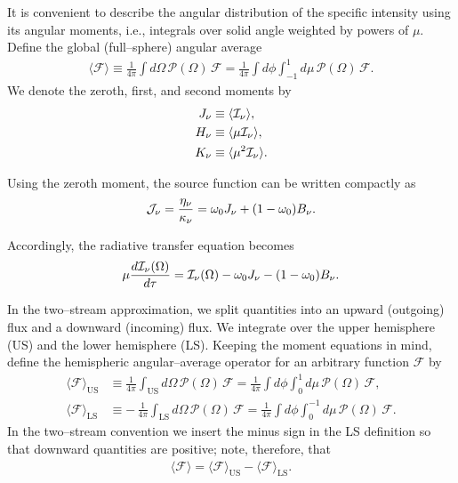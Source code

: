 It is convenient to describe the angular distribution of the specific intensity using its angular moments, i.e., integrals over solid angle weighted by powers of $\mu$. Define the global (full–sphere) angular average
\begin{align}
\label{eq:all_int}
\langle \mathcal{F} \rangle \equiv \frac{1}{4\pi} \int d\Omega \, \mathcal{P}(\Omega)\, \mathcal{F}
= \frac{1}{4\pi} \int d\phi \int_{-1}^{1} d\mu \, \mathcal{P}(\Omega)\, \mathcal{F} .
\end{align}
We denote the zeroth, first, and second moments by
\begin{align}
{J_\nu} &\equiv \langle {\mathcal{I}_\nu} \rangle ,\\
{H_\nu} &\equiv \langle \mu {\mathcal{I}_\nu} \rangle ,\\
{K_\nu} &\equiv \langle \mu^2 {\mathcal{I}_\nu} \rangle .
\end{align}

Using the zeroth moment, the source function can be written compactly as
\begin{align}
{\mathcal{J}_\nu} = \frac{\eta_\nu}{\kappa_\nu} = \omega_0 J_\nu + (1-\omega_0) B_\nu .
\label{eq:sourcef}
\end{align}

Accordingly, the radiative transfer equation becomes
\begin{align}
\label{eq:rtbasic}
\mu \frac{d {\mathcal{I}_\nu}(\Omega)}{d \tau}
= {\mathcal{I}_\nu}(\Omega) - \omega_0 J_\nu - (1-\omega_0) B_\nu .
\end{align}

In the two–stream approximation, we split quantities into an upward (outgoing) flux and a downward (incoming) flux. We integrate over the upper hemisphere (US) and the lower hemisphere (LS). Keeping the moment equations in mind, define the hemispheric angular–average operator for an arbitrary function $\mathcal{F}$ by
\begin{align}
\label{eq:us_int}
  \langle \mathcal{F} \rangle_\mathrm{US}
  &\equiv \frac{1}{4\pi} \int_{\mathrm{US}} d\Omega \, \mathcal{P}(\Omega)\, \mathcal{F}
   = \frac{1}{4\pi} \int d\phi \int_{0}^{1} d\mu \, \mathcal{P}(\Omega)\, \mathcal{F},\\
\label{eq:ls_int}
  \langle \mathcal{F} \rangle_\mathrm{LS}
  &\equiv -\,\frac{1}{4\pi} \int_{\mathrm{LS}} d\Omega \, \mathcal{P}(\Omega)\, \mathcal{F}
   = \frac{1}{4\pi} \int d\phi \int_{0}^{-1} d\mu \, \mathcal{P}(\Omega)\, \mathcal{F}.
\end{align}
In the two–stream convention we insert the minus sign in the LS definition so that downward quantities are positive; note, therefore, that
\begin{align}
\langle \mathcal{F} \rangle = \langle \mathcal{F} \rangle_\mathrm{US} - \langle \mathcal{F} \rangle_\mathrm{LS}.
\end{align}

